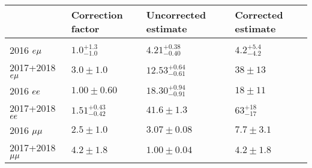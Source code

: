 \begin{table}[ht] 
\noindent \centering{}
\label{100to500um_estimates}
\begin{tabular}{llll}
\hline
  & Correction factor & Uncorrected estimate & Corrected estimate\\
  \hline\\[-2.4ex]
2016 $e{\mu}$       & $1.0^{+1.3}_{-1.0}$    & $4.21^{+0.38}_{-0.40}$  & $4.2^{+5.4}_{-4.2}$\\[0.5ex]
2017+2018 $e{\mu}$  & $3.0\pm1.0$            & $12.53^{+0.64}_{-0.61}$ & $38\pm13$\\[0.5ex]
2016 $ee$        & $1.00\pm0.60$          & $18.30^{+0.94}_{-0.91}$ & $18\pm11$\\[0.5ex]
2017+2018 $ee$   & $1.51^{+0.43}_{-0.42}$ & $41.6\pm1.3$            & $63^{+18}_{-17}$\\[0.5ex]
2016 ${\mu}{\mu}$      & $2.5\pm1.0$            & $3.07\pm0.08$           & $7.7\pm3.1$\\[0.5ex]
2017+2018 ${\mu}{\mu}$ & $4.2\pm1.8$            & $1.00\pm0.04$           & $4.2\pm1.8$\\[0.5ex]
\hline
\end{tabular}
\end{table}